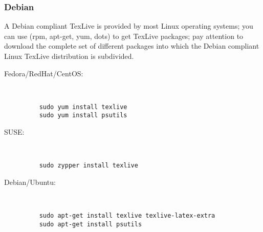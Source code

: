 
\subsubsection*{Debian}
A Debian compliant TexLive is provided by most Linux operating systems; you can use (rpm, apt-get, yum, dots) to get TexLive packages; pay attention to download the complete set of different packages into which the Debian compliant Linux TexLive  distribution is subdivided. 
%
\begin{description}
  \item[Fedora/RedHat/CentOS:]~\\[-\baselineskip]
    \begin{verbatim} 
    sudo yum install texlive 
    sudo yum install psutils 
    \end{verbatim}
  \item[SUSE:]~\\[-1.5\baselineskip]
    \begin{verbatim}
    sudo zypper install texlive
    \end{verbatim}
  \item[Debian/Ubuntu:]~\\[-\baselineskip]
    \begin{verbatim} 
    sudo apt-get install texlive texlive-latex-extra 
    sudo apt-get install psutils
    \end{verbatim}
\end{description}

